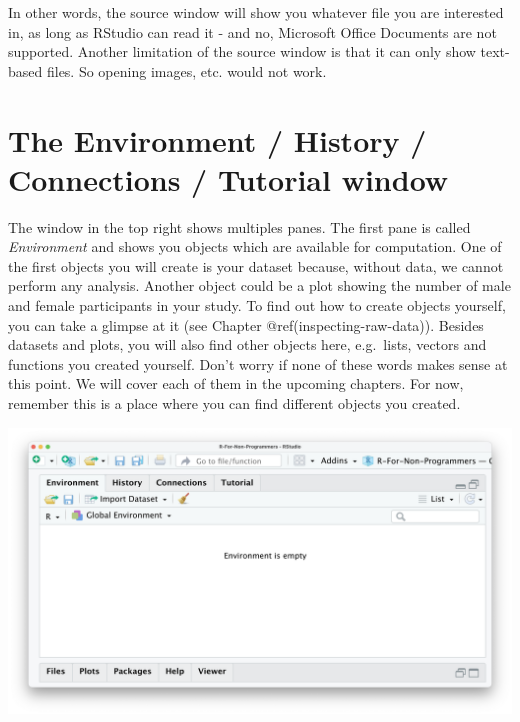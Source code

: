 \documentclass[
  letterpaper,
]{krantz}
\begin{document}
In other words, the source window will show you whatever file you are
interested in, as long as RStudio can read it - and no, Microsoft Office
Documents are not supported. Another limitation of the source window is
that it can only show text-based files. So opening images, etc. would
not work.

\section{The Environment / History / Connections / Tutorial
window}\label{the-environment-history-connections-tutorial-window}

The window in the top right shows multiples panes. The first pane is
called \emph{Environment} and shows you objects which are available for
computation. One of the first objects you will create is your dataset
because, without data, we cannot perform any analysis. Another object
could be a plot showing the number of male and female participants in
your study. To find out how to create objects yourself, you can take a
glimpse at it (see Chapter @ref(inspecting-raw-data)). Besides datasets
and plots, you will also find other objects here, e.g.~lists, vectors
and functions you created yourself. Don't worry if none of these words
makes sense at this point. We will cover each of them in the upcoming
chapters. For now, remember this is a place where you can find different
objects you created.

\includegraphics{images/chapter_04_img/04_environment_history_etc/01_rstudio_environment.png}
\end{document}
